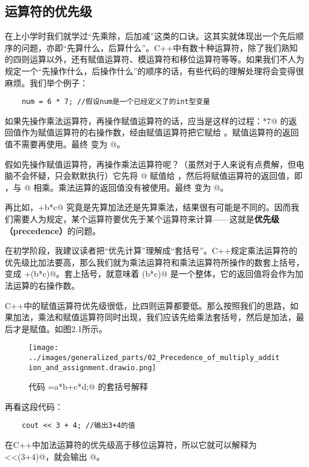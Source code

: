 \subsection*{运算符的优先级}
在上小学时我们就学过``先乘除，后加减''这类的口诀。这其实就体现出一个先后顺序的问题，亦即``先算什么，后算什么''。C++中有数十种运算符，除了我们熟知的四则运算以外，还有赋值运算符、模运算符和移位运算符等等。如果我们不人为规定一个``先操作什么，后操作什么''的顺序的话，有些代码的理解处理将会变得很麻烦。我们举个例子：
\begin{lstlisting}
    num = 6 * 7; //假设num是一个已经定义了的int型变量
\end{lstlisting}\par
如果先操作乘法运算符，再操作赋值运算符的话，应当是这样的过程：*7@ 的返回值作为赋值运算符的右操作数，经由赋值运算符把它赋给 \lstinline@num@。赋值运算符的返回值不需要再使用。最终 \lstinline@num@ 变为 @。\par
假如先操作赋值运算符，再操作乘法运算符呢？（虽然对于人来说有点费解，但电脑不会怀疑，只会默默执行）它先将 @ 赋值给 \lstinline@num@，然后将赋值运算符的返回值，即 \lstinline@num@，与 @ 相乘。乘法运算的返回值没有被使用。最终 \lstinline@num@ 变为 @。\par
再比如，\lstinline@a+b*c@ 究竟是先算加法还是先算乘法，结果很有可能是不同的。因而我们需要人为规定，某个运算符要优先于某个运算符来计算——这就是\textbf{优先级（precedence）}的问题。\par
在初学阶段，我建议读者把``优先计算''理解成``套括号''。C++规定乘法运算符的优先级比加法要高，那么我们就为乘法运算符和乘法运算符所操作的数套上括号，变成 \lstinline@a+(b*c)@。套上括号，就意味着 \lstinline@(b*c)@ 是一个整体，它的返回值将会作为加法运算的右操作数。\par
C++中的赋值运算符优先级很低，比四则运算都要低。那么按照我们的思路，如果加法，乘法和赋值运算符同时出现，我们应该先给乘法套括号，然后是加法，最后才是赋值。如图2.1所示。\par
\begin{figure}[htbp]
    \centering
    \texttt{[image: ../images/generalized\_parts/02\_Precedence\_of\_multiply\_addition\_and\_assignment.drawio.png]}
    \caption{代码 \lstinline@num=a*b+c*d;@ 的套括号解释}
\end{figure}
再看这段代码：
\begin{lstlisting}
    cout << 3 + 4; //输出3+4的值
\end{lstlisting}
在C++中加法运算符的优先级高于移位运算符，所以它就可以解释为 \lstinline@cout<<(3+4)@，就会输出 @。\par
